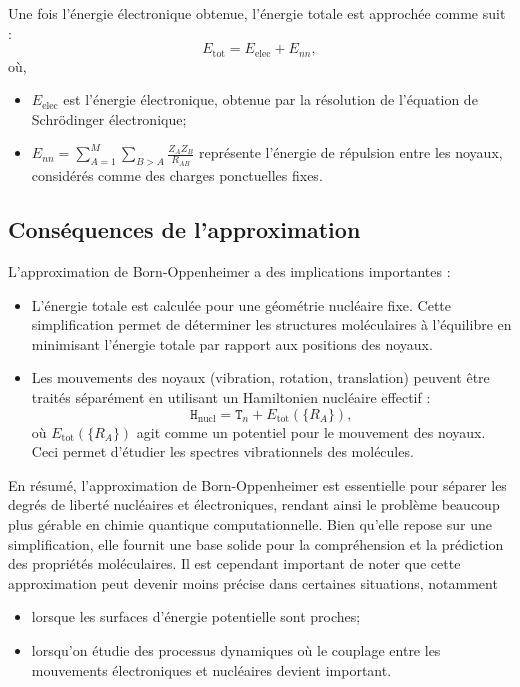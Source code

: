 \documentclass[12pt,a4paper]{article} %
\numberwithin{equation}{section} %
\numberwithin{figure}{section} %
\numberwithin{table}{section} %
\begin{document}
Une fois l'énergie électronique obtenue, l'énergie totale est approchée comme suit :
\begin{equation}
E_{\text{tot}} = E_{\text{elec}} + E_{nn},
\end{equation}
où,
\begin{itemize}
\item $E_{\text{elec}}$ est l'énergie électronique, obtenue par la résolution de l'équation de Schrödinger électronique;
\item $E_{nn}=\sum_{A=1}^M \sum_{B>A} \frac{Z_A Z_B}{R_{AB}}$ représente l'énergie de répulsion entre les noyaux, considérés comme des charges ponctuelles fixes.
\end{itemize}

\subsection{Conséquences de l'approximation}

L'approximation de Born-Oppenheimer a des implications importantes :
\begin{itemize}
\item L'énergie totale est calculée pour une géométrie nucléaire fixe.  Cette simplification permet de déterminer les structures moléculaires à l'équilibre en minimisant l'énergie totale par rapport aux positions des noyaux.
\item Les mouvements des noyaux (vibration, rotation, translation) peuvent être traités séparément en utilisant un Hamiltonien nucléaire effectif :
\begin{equation}
\mathtt{H}_{\text{nucl}} = \mathtt{T}_n + E_{\text{tot}}(\{R_A\}) ,
\end{equation}
où $E_{\text{tot}}(\{R_A\})$ agit comme un potentiel pour le mouvement des noyaux. Ceci permet d'étudier les spectres vibrationnels des molécules.
\end{itemize}

En résumé, l'approximation de Born-Oppenheimer est essentielle pour séparer les degrés de liberté nucléaires et électroniques, rendant ainsi le problème beaucoup plus gérable en chimie quantique computationnelle. Bien qu'elle repose sur une simplification, elle fournit une base solide pour la compréhension et la prédiction des propriétés moléculaires. Il est cependant important de noter que cette approximation peut devenir moins précise dans certaines situations, notamment
\begin{itemize}
\item lorsque les surfaces d'énergie potentielle sont proches;
\item lorsqu'on étudie des processus dynamiques où le couplage entre les mouvements électroniques et nucléaires devient important.
\end{itemize}
\end{document}
